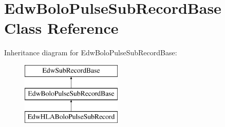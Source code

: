 \hypertarget{class_edw_bolo_pulse_sub_record_base}{
\section{EdwBoloPulseSubRecordBase Class Reference}
\label{class_edw_bolo_pulse_sub_record_base}
}
Inheritance diagram for EdwBoloPulseSubRecordBase:\begin{figure}[H]
\begin{center}
\leavevmode
\includegraphics[height=3cm]{class_edw_bolo_pulse_sub_record_base}
\end{center}
\end{figure}
